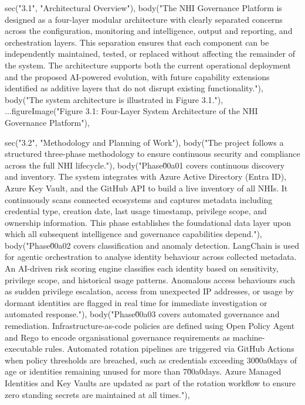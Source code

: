   sec("3.1", "Architectural Overview"),
  body("The NHI Governance Platform is designed as a four-layer modular architecture with clearly separated concerns across the configuration, monitoring and intelligence, output and reporting, and orchestration layers. This separation ensures that each component can be independently maintained, tested, or replaced without affecting the remainder of the system. The architecture supports both the current operational deployment and the proposed AI-powered evolution, with future capability extensions identified as additive layers that do not disrupt existing functionality."),
  body("The system architecture is illustrated in Figure 3.1."),
  ...figureImage("Figure 3.1: Four-Layer System Architecture of the NHI Governance Platform"),

  sec("3.2", "Methodology and Planning of Work"),
  body("The project follows a structured three-phase methodology to ensure continuous security and compliance across the full NHI lifecycle."),
  body("Phase\u00a01 covers continuous discovery and inventory. The system integrates with Azure Active Directory (Entra ID), Azure Key Vault, and the GitHub API to build a live inventory of all NHIs. It continuously scans connected ecosystems and captures metadata including credential type, creation date, last usage timestamp, privilege scope, and ownership information. This phase establishes the foundational data layer upon which all subsequent intelligence and governance capabilities depend."),
  body("Phase\u00a02 covers classification and anomaly detection. LangChain is used for agentic orchestration to analyse identity behaviour across collected metadata. An AI-driven risk scoring engine classifies each identity based on sensitivity, privilege scope, and historical usage patterns. Anomalous access behaviours such as sudden privilege escalation, access from unexpected IP addresses, or usage by dormant identities are flagged in real time for immediate investigation or automated response."),
  body("Phase\u00a03 covers automated governance and remediation. Infrastructure-as-code policies are defined using Open Policy Agent and Rego to encode organisational governance requirements as machine-executable rules. Automated rotation pipelines are triggered via GitHub Actions when policy thresholds are breached, such as credentials exceeding 30\u00a0days of age or identities remaining unused for more than 7\u00a0days. Azure Managed Identities and Key Vaults are updated as part of the rotation workflow to ensure zero standing secrets are maintained at all times."),

